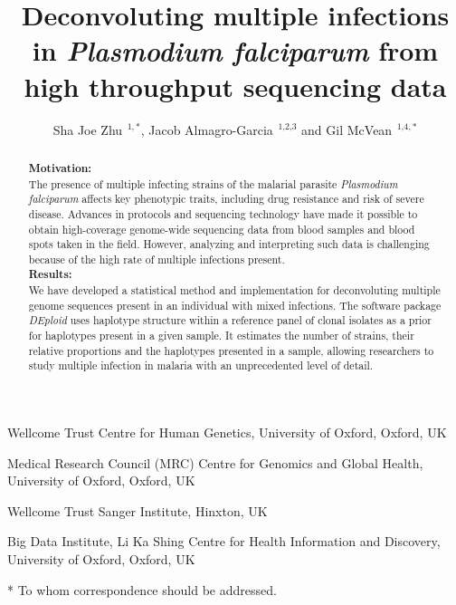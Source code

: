 \documentclass{nature}
\begin{document}
\title{Deconvoluting multiple infections in {\it Plasmodium falciparum} from high throughput sequencing data}
\author{Sha Joe Zhu\,$^{\text{ 1},*}$, Jacob Almagro-Garcia\,$^{\text{ 1,2,3}}$ and Gil McVean\,$^{\text{ 1,4},*}$}

\maketitle

\begin{affiliations}
\item Wellcome Trust Centre for Human Genetics, University of Oxford, Oxford, UK
\item Medical Research Council (MRC) Centre for Genomics and Global Health, University of Oxford, Oxford, UK
\item Wellcome Trust Sanger Institute, Hinxton, UK
\item Big Data Institute, Li Ka Shing Centre for Health Information and Discovery, University of Oxford, Oxford, UK
\item[*] To whom correspondence should be addressed.
\end{affiliations}

\begin{abstract}
\noindent\textbf{Motivation:}  \\ \noindent
The presence of multiple infecting strains of the malarial parasite {\it Plasmodium falciparum} affects  key phenotypic  traits, including drug resistance and risk of severe disease. Advances in protocols and sequencing technology have made it possible  to obtain  high-coverage genome-wide  sequencing data from blood samples and blood spots taken in the field. However, analyzing and interpreting such data is challenging  because of the high rate of multiple infections present.\\
\textbf{Results:}  \\ \noindent  We have developed a statistical method and implementation for deconvoluting multiple genome sequences present in an individual with mixed infections.  The software package {\it DEploid} uses haplotype structure within a reference panel of clonal isolates as a prior for haplotypes present in a given sample. It estimates the number of strains, their relative proportions and the haplotypes presented in a sample, allowing researchers to study multiple infection in malaria with an unprecedented level of detail.\\
\end{abstract}
\end{document}
